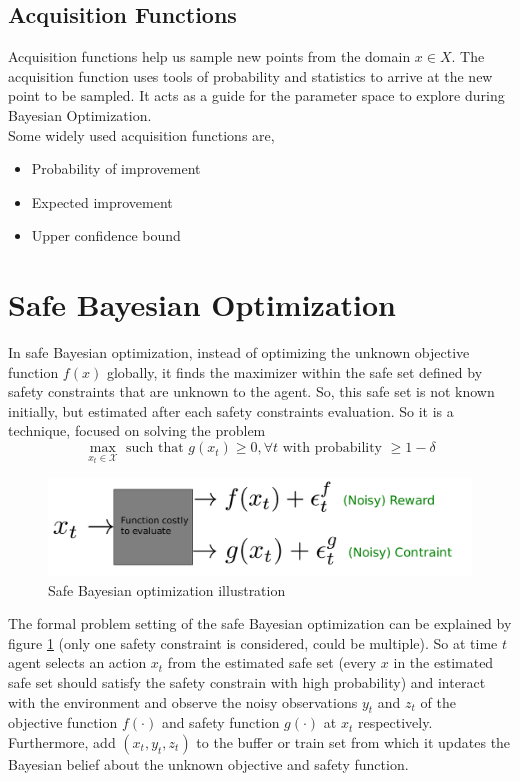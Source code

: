 \subsection{Acquisition Functions}
Acquisition functions help us sample new points from the domain $x \in X$. The acquisition function uses tools of probability and statistics to arrive at the new point to be sampled. It acts as a guide for the parameter space to explore during Bayesian Optimization.\\
Some widely used acquisition functions are,
\begin{itemize}
	\item Probability of improvement
	\item Expected improvement
	\item Upper confidence bound
\end{itemize}

\section{Safe Bayesian Optimization}\label{sec:safebo}
In safe Bayesian optimization, instead of optimizing the unknown objective function $f(x)$ globally, it finds the maximizer within the safe set defined by safety constraints that are unknown to the agent. 
So, this safe set is not known initially, but estimated after each safety constraints evaluation. So it is a technique, focused on solving the problem
$$ \max_{x_t\in\mathcal{X}}\text{ such that }g(x_t)\geq 0, \forall t\text{ with probability }\geq 1-\delta $$
\begin{figure}[H]
	\centering
	\includegraphics[scale=0.30]{figures/safebo.png}
	\caption{Safe Bayesian optimization illustration}
	\label{fig:safebo}
\end{figure}

The formal problem setting of the safe Bayesian optimization can be explained by figure \ref{fig:safebo} (only one safety constraint is considered, could be multiple). So at time $t$ agent selects an action $x_t$ from the estimated safe set (every $x$ in the estimated safe set should satisfy the safety constrain with high probability) and interact with the environment and observe the noisy observations $y_t$ and $z_t$ of the objective function $f(\cdot)$ and safety function $g(\cdot)$ at $x_t$ respectively. Furthermore, add $(x_t, y_t, z_t )$ to the buffer or train set from which it updates the Bayesian belief about the unknown objective and safety function.

